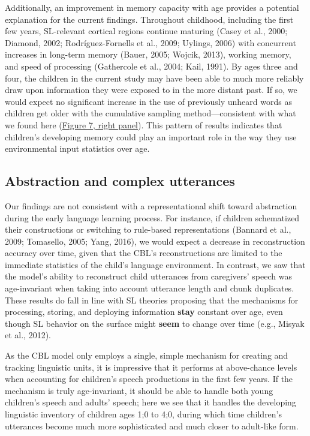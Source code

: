 \documentclass[man,mask,floatsintext]{apa6}
\begin{document}
Additionally, an improvement in memory capacity with age provides a
potential explanation for the current findings. Throughout childhood,
including the first few years, SL-relevant cortical regions continue
maturing (Casey et al., 2000; Diamond, 2002; Rodríguez-Fornells et al.,
2009; Uylings, 2006) with concurrent increases in long-term memory
(Bauer, 2005; Wojcik, 2013), working memory, and speed of processing
(Gathercole et al., 2004; Kail, 1991). By ages three and four, the
children in the current study may have been able to much more reliably
draw upon information they were exposed to in the more distant past. If
so, we would expect no significant increase in the use of previously
unheard words as children get older with the cumulative sampling
method---consistent with what we found here
(\protect\hyperlink{fig7}{Figure 7, right panel}). This pattern of
results indicates that children's developing memory could play an
important role in the way they use environmental input statistics over
age.

\subsection{Abstraction and complex
utterances}\label{abstraction-and-complex-utterances}

Our findings are not consistent with a representational shift toward
abstraction during the early language learning process. For instance, if
children schematized their constructions or switching to rule-based
representations (Bannard et al., 2009; Tomasello, 2005; Yang, 2016), we
would expect a decrease in reconstruction accuracy over time, given that
the CBL's reconstructions are limited to the immediate statistics of the
child's language environment. In contrast, we saw that the model's
ability to reconstruct child utterances from caregivers' speech was
age-invariant when taking into account utterance length and chunk
duplicates. These results do fall in line with SL theories proposing
that the mechanisms for processing, storing, and deploying information
\textbf{stay} constant over age, even though SL behavior on the surface
might \textbf{seem} to change over time (e.g., Misyak et al., 2012).

As the CBL model only employs a single, simple mechanism for creating
and tracking linguistic units, it is impressive that it performs at
above-chance levels when accounting for children's speech productions in
the first few years. If the mechanism is truly age-invariant, it should
be able to handle both young children's speech and adults' speech; here
we see that it handles the developing linguistic inventory of children
ages 1;0 to 4;0, during which time children's utterances become much
more sophisticated and much closer to adult-like form.
\end{document}
